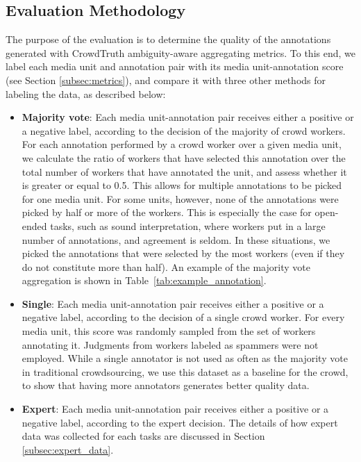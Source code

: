 \subsection{Evaluation Methodology}
\label{subsec:evaluation}

The purpose of the evaluation is to determine the quality of the annotations generated with CrowdTruth ambiguity-aware aggregating metrics. To this end, we label each media unit and annotation pair with its media unit-annotation score (see Section \ref{subsec:metrics}), and compare it with three other methods for labeling the data, as described below:

\begin{itemize}
\item \textbf{Majority vote}:  Each media unit-annotation pair receives either a positive or a negative label, according to the decision of the majority of crowd workers. For each annotation performed by a crowd worker over a given media unit, we calculate the ratio of workers that have selected this annotation over the total number of workers that have annotated the unit, and assess whether it is greater or equal to 0.5. This allows for multiple annotations to be picked for one media unit. For some units, however, none of the annotations were picked by half or more of the workers. This is especially the case for open-ended tasks, such as sound interpretation, where workers put in a large number of annotations, and agreement is seldom. In these situations, we picked the annotations that were selected by the most workers (even if they do not constitute more than half). An example of the majority vote aggregation is shown in Table~\ref{tab:example_annotation}.

\item \textbf{Single}:  Each media unit-annotation pair receives either a positive or a negative label, according to the decision of a single crowd worker. For every media unit, this score was randomly sampled
from the set of workers annotating it. Judgments from workers labeled as spammers were not employed. While a single annotator is not used as often as the majority vote in traditional crowdsourcing, we use this dataset as a baseline for the crowd, to show that having more annotators generates better quality data.

\item \textbf{Expert}: Each media unit-annotation pair receives either a positive or a negative label, according to the expert decision. The details of how expert data was collected for each tasks are discussed in Section \ref{subsec:expert_data}.
\end{itemize}

